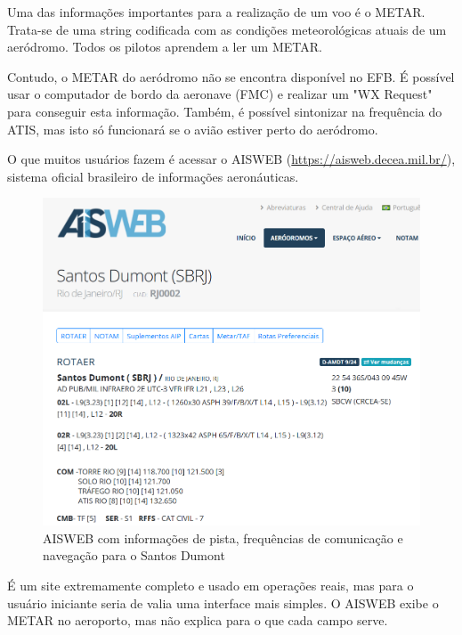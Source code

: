 Uma das informações importantes para a realização de um voo é o METAR. Trata-se 
de uma string codificada com as condições meteorológicas atuais de um aeródromo. 
Todos os pilotos aprendem a ler um METAR.

Contudo, o METAR do aeródromo não se encontra disponível no EFB. É possível usar
 o computador de bordo da aeronave (FMC) e realizar um "WX Request" para conseguir 
 esta informação. Também, é 
 possível sintonizar na frequência do ATIS, mas isto só funcionará se o avião
 estiver perto do aeródromo.

O que muitos usuários fazem é acessar o AISWEB 
(\url{https://aisweb.decea.mil.br/}), sistema oficial brasileiro de informações
aeronáuticas. 

\begin{figure}[ht]
    \begin{center}
    \includegraphics[width=350pt]{img/aisweb.png}
    \caption{AISWEB com informações de pista, frequências de comunicação e navegação para o Santos Dumont}
    \label{fig:aisweb}
    \end{center}
\end{figure}

É um site extremamente completo e usado em operações reais, mas para o usuário 
iniciante seria de valia uma interface mais simples. O AISWEB exibe o METAR no 
aeroporto, mas não explica para o que cada campo serve.

